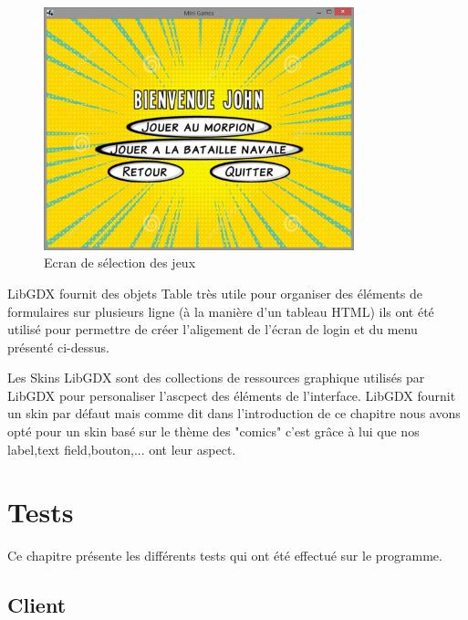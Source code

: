 \documentclass{report}
\begin{document}
\begin{figure}[H]
	\centering\includegraphics[width=9cm]{menuJeux}
	\caption{Ecran de sélection des jeux}
	\label{Ecran de selection}
\end{figure}

LibGDX fournit des objets Table très utile pour organiser des éléments de formulaires sur plusieurs ligne
(à la manière d'un tableau HTML) ils ont été utilisé pour permettre de créer l'aligement de l'écran de login et du menu
présenté ci-dessus.

Les Skins LibGDX sont des collections de ressources graphique utilisés par LibGDX pour personaliser l'ascpect des éléments
de l'interface. LibGDX fournit un skin par défaut mais comme dit dans l'introduction de ce chapitre nous avons opté pour un skin
basé sur le thème des "comics" c'est grâce à lui que nos label,text field,bouton,... ont leur aspect.

\chapter{Tests}
Ce chapitre présente les différents tests qui ont été effectué sur le programme.
\section{Client}
\end{document}

